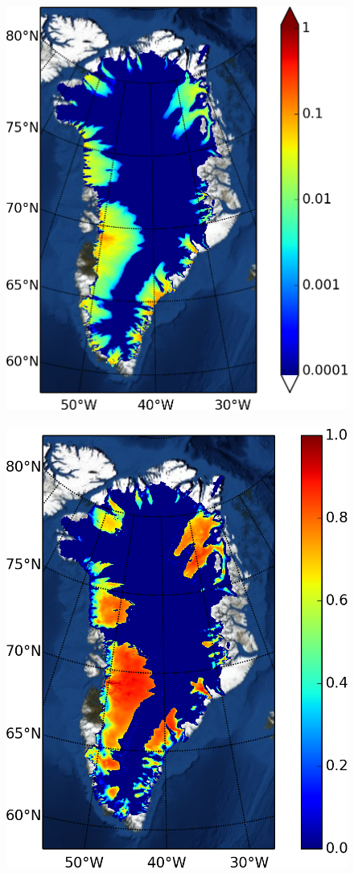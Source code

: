\documentclass[gmd]{copernicus}   %
\begin{document}
\begin{figure}[ht]
\mbox{\includegraphics[height=\grnht,keepaspectratio=true]{distributed-decoupled-bwat} \,
\includegraphics[height=\grnht,keepaspectratio=true]{distributed-decoupled-bwprel}}

\end{figure}
\end{document}
